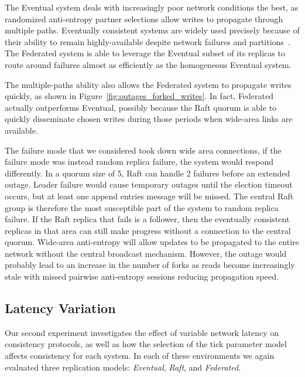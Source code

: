 \documentclass[10pt,conference,letterpaper]{IEEEtran}
\begin{document}
The Eventual system deals with increasingly poor network conditions the best,
as randomized anti-entropy partner selections allow writes to propagate through multiple
paths.
Eventually consistent systems are widely used precisely because of their ability to remain
highly-available despite network failures and
partitions~\cite{bailis_bolt-causal_2013,bailis_probabilistically_2012,bailis_quantifying_2014}.
The Federated system is able to leverage the Eventual subset of its replicas to route
around failures almost as efficiently as the homogeneous Eventual system.

The multiple-paths ability also allows the Federated system to propagate writes quickly,
as shown in Figure~\ref{fig:outages_forked_writes}. In fact, Federated actually outperforms
Eventual, possibly because the Raft quorum is able to quickly disseminate chosen
writes during those periods when wide-area links are available.

The failure mode that we considered took down wide area connections, if
the failure mode was instead random replica failure, the system would respond
differently.
In a quorum size of 5, Raft can handle 2 failures before an extended outage.
Leader failure would cause temporary outages until the election timeout
occurs, but at least one append entries message will be missed.
The central Raft group is therefore the most susceptible part of the system to
random replica failure.
If the Raft replica that fails is a follower, then the eventually consistent
replicas in that area can still make progress without a connection to the
central quorum.
Wide-area anti-entropy will allow updates to be propagated to the entire
network without the central broadcast mechanism.
However, the outage would probably lead to an increase in the number of forks
as reads become increasingly stale with missed pairwise anti-entropy sessions
reducing propagation speed.


\subsection{Latency Variation}


Our second experiment investigates the effect of variable network latency on
consistency protocols, as well as how the selection of the tick parameter
model affects consistency for each system.
In each of these environments we again evaluated three replication models:
\textit{Eventual}, \textit{Raft}, and \textit{Federated}.
\end{document}
